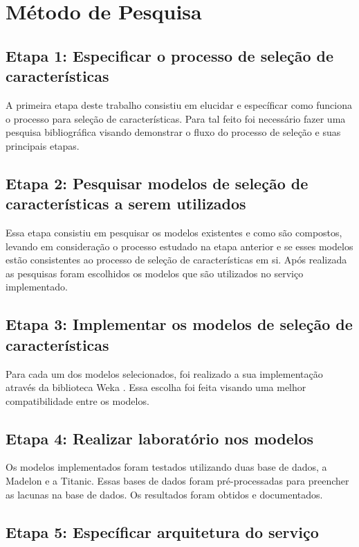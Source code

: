 \section{Método de Pesquisa}

\subsection{Etapa 1: Especificar o processo de seleção de características}

A primeira etapa deste trabalho consistiu em elucidar e específicar como funciona o processo para seleção de características. Para tal feito foi necessário fazer uma pesquisa bibliográfica visando demonstrar o fluxo do processo de seleção e suas principais etapas.

\subsection{Etapa 2: Pesquisar modelos de seleção de características a serem utilizados}

Essa etapa consistiu em pesquisar os modelos existentes e como são compostos, levando em consideração o processo estudado na etapa anterior e se esses modelos estão consistentes ao processo de seleção de características em si. Após realizada as pesquisas foram escolhidos os modelos que são utilizados no serviço implementado.

\subsection{Etapa 3: Implementar os modelos de seleção de características}

Para cada um dos modelos selecionados, foi realizado a sua implementação através da biblioteca Weka \cite{weka}. Essa escolha foi feita visando uma melhor compatibilidade entre os modelos.

\subsection{Etapa 4: Realizar laboratório nos modelos}

Os modelos implementados foram testados utilizando duas base de dados, a Madelon \cite{madelon_2003} e a Titanic. Essas bases de dados foram pré-processadas para preencher as lacunas na base de dados. Os resultados foram obtidos e documentados.

\subsection{Etapa 5: Específicar arquitetura do serviço}

